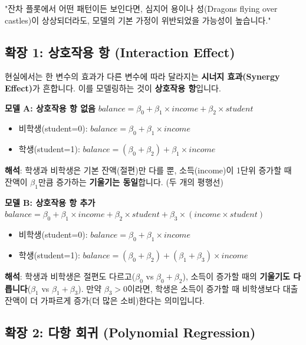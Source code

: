 \documentclass[11pt,a4paper]{book}
\theoremstyle{definition}
\begin{document}
\begin{summarybox}[title=잔차 분석의 핵심]
"잔차 플롯에서 어떤 패턴이든 보인다면, 심지어 용이나 성(Dragons flying over castles)이 상상되더라도, 모델의 기본 가정이 위반되었을 가능성이 높습니다."
\end{summarybox}

\subsection{확장 1: 상호작용 항 (Interaction Effect)}

현실에서는 한 변수의 효과가 다른 변수에 따라 달라지는 \textbf{시너지 효과(Synergy Effect)}가 흔합니다. 이를 모델링하는 것이 \textbf{상호작용 항}입니다.

\begin{examplebox}[title=예시: 소득과 학생 여부가 대출 잔액에 미치는 영향]
\textbf{모델 A: 상호작용 항 없음}
$balance = \beta_0 + \beta_1 \times income + \beta_2 \times student$
\begin{itemize}
    \item 비학생(student=0): $balance = \beta_0 + \beta_1 \times income$
    \item 학생(student=1): $balance = (\beta_0 + \beta_2) + \beta_1 \times income$
\end{itemize}
\textbf{해석}: 학생과 비학생은 기본 잔액(절편)만 다를 뿐, 소득(income)이 1단위 증가할 때 잔액이 $\beta_1$만큼 증가하는 \textbf{기울기는 동일}합니다. (두 개의 평행선)

\textbf{모델 B: 상호작용 항 추가}
$balance = \beta_0 + \beta_1 \times income + \beta_2 \times student + \textbf{$\beta_3 \times (income \times student)$}$
\begin{itemize}
    \item 비학생(student=0): $balance = \beta_0 + \beta_1 \times income$
    \item 학생(student=1): $balance = (\beta_0 + \beta_2) + \textbf{$(\beta_1 + \beta_3)$} \times income$
\end{itemize}
\textbf{해석}: 학생과 비학생은 절편도 다르고($\beta_0$ vs $\beta_0+\beta_2$), 소득이 증가할 때의 \textbf{기울기도 다릅니다}($\beta_1$ vs $\beta_1+\beta_3$).
만약 $\beta_3 > 0$이라면, 학생은 소득이 증가할 때 비학생보다 대출 잔액이 더 가파르게 증가(더 많은 소비)한다는 의미입니다.
\end{examplebox}

\subsection{확장 2: 다항 회귀 (Polynomial Regression)}
\end{document}
